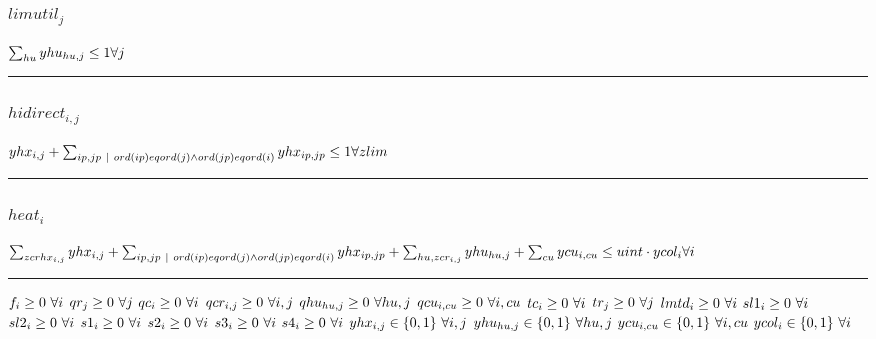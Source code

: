 \documentclass[11pt]{article}
\begin{document}
\subsubsection*{$limutil_{j}$}
$
\sum_{hu} yhu_{hu,j} \leq 1\hfill \forall j
$
\vspace{5pt}
\hrule
\subsubsection*{$hidirect_{i,j}$}
$
yhx_{i,j} + \sum_{ip,jp ~ | ~ ord(ip) eq ord(j) \wedge ord(jp) eq ord(i)} yhx_{ip,jp} \leq 1\hfill \forall zlim
$
\vspace{5pt}
\hrule
\subsubsection*{$heat_{i}$}
$
\sum_{zcrhx_{i,j}} yhx_{i,j} + \sum_{ip,jp ~ | ~ ord(ip) eq ord(j) \wedge ord(jp) eq ord(i)} yhx_{ip,jp} + \sum_{hu,zcr_{i,j}} yhu_{hu,j} + \sum_{cu} ycu_{i,cu} \leq uint \cdot ycol_{i}\hfill \forall i
$
\vspace{5pt}
\hrule
\bigskip
$f_{i}\geq 0 ~ \forall i\\$
$qr_{j}\geq 0 ~ \forall j\\$
$qc_{i}\geq 0 ~ \forall i\\$
$qcr_{i,j}\geq 0 ~ \forall i,j\\$
$qhu_{hu,j}\geq 0 ~ \forall hu,j\\$
$qcu_{i,cu}\geq 0 ~ \forall i,cu\\$
$tc_{i}\geq 0 ~ \forall i\\$
$tr_{j}\geq 0 ~ \forall j\\$
$lmtd_{i}\geq 0 ~ \forall i\\$
$sl1_{i}\geq 0 ~ \forall i\\$
$sl2_{i}\geq 0 ~ \forall i\\$
$s1_{i}\geq 0 ~ \forall i\\$
$s2_{i}\geq 0 ~ \forall i\\$
$s3_{i}\geq 0 ~ \forall i\\$
$s4_{i}\geq 0 ~ \forall i\\$
$yhx_{i,j}\in \{0,1\} ~ \forall i,j\\$
$yhu_{hu,j}\in \{0,1\} ~ \forall hu,j\\$
$ycu_{i,cu}\in \{0,1\} ~ \forall i,cu\\$
$ycol_{i}\in \{0,1\} ~ \forall i\\$
\end{document}
